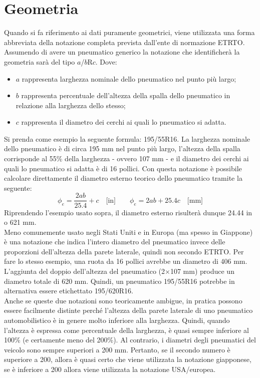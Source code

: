 \section{Geometria}
Quando si fa riferimento ai dati puramente geometrici, viene utilizzata una forma abbreviata della notazione completa prevista dall'ente di normazione \ac{ETRTO}. Assumendo di avere un pneumatico generico la notazione che identificherà la geometria sarà del tipo $a$/$b$R$c$. Dove:
\begin{itemize}
	\item $a$ rappresenta larghezza nominale dello pneumatico nel punto più largo;
	\item $b$ rappresenta percentuale dell'altezza della spalla dello pneumatico in relazione alla larghezza dello stesso;
	\item $c$ rappresenta il diametro dei cerchi ai quali lo pneumatico si adatta.
\end{itemize}
Si prenda come esempio la seguente formula: 195/55R16. La larghezza nominale dello pneumatico è di circa 195 mm nel punto più largo, l'altezza della spalla corrisponde al 55\% della larghezza - ovvero 107 mm - e il diametro dei cerchi ai quali lo pneumatico si adatta è di 16 pollici.  Con questa notazione è possibile calcolare direttamente il diametro esterno teorico dello pneumatico tramite la seguente:
%
\begin{equation}
\phi_e = \frac{2ab}{25.4}+c \quad \text{[in]} \qquad
\phi_e = 2ab+25.4c \quad \text{[mm]}
\end{equation}
%
\noindent
Riprendendo l'esempio usato sopra, il diametro esterno risulterà dunque 24.44 in o 621 mm.\\
Meno comunemente usato negli Stati Uniti e in Europa (ma spesso in Giappone) è una notazione che indica l'intero diametro del pneumatico invece delle proporzioni dell'altezza della parete laterale, quindi non secondo \ac{ETRTO}. Per fare lo stesso esempio, una ruota da 16 pollici avrebbe un diametro di 406 mm. L'aggiunta del doppio dell'altezza del pneumatico (2$\times$107 mm) produce un diametro totale di 620 mm. Quindi, un pneumatico 195/55R16 potrebbe in alternativa essere etichettato 195/620R16.\\
Anche se queste due notazioni sono teoricamente ambigue, in pratica possono essere facilmente distinte perché l'altezza della parete laterale di uno pneumatico automobilistico è in genere molto inferiore alla larghezza. Quindi, quando l'altezza è espressa come percentuale della larghezza, è quasi sempre inferiore al 100\% (e certamente meno del 200\%). Al contrario, i diametri degli pneumatici del veicolo sono sempre superiori a 200 mm. Pertanto, se il secondo numero è superiore a 200, allora è quasi certo che viene utilizzata la notazione giapponese, se è inferiore a 200 allora viene utilizzata la notazione USA/europea.

